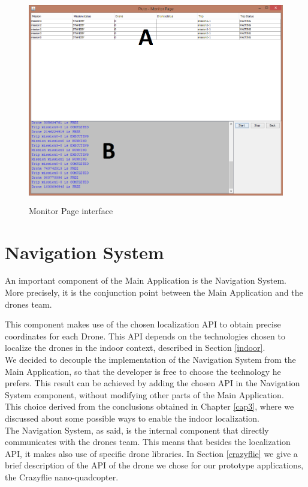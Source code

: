 \begin{figure}[h!]
  \centering
  \includegraphics[width=\linewidth,height=9cm]
  {pictures/MonitorPage.png}
  \caption{Monitor Page interface}
  \label{fig:MonitorPage}
\end{figure}

\section{Navigation System}\label{navigationSystem}

An important component of the Main Application is the Navigation System.
More precisely, it is the conjunction point between the Main Application and the drones team. 

This component makes use of the chosen localization API to obtain precise coordinates for each Drone.
This API depends on the technologies chosen to localize the drones in the indoor context, described in Section \ref{indoor}.
\\ 

We decided to decouple the implementation of the Navigation System from the Main Application, so that the developer is free to choose the technology he prefers.
This result can be achieved by adding the chosen API in the Navigation System component, without modifying other parts of the Main Application.
\\
This choice derived from the conclusions obtained in Chapter \ref{cap3}, where we discussed about some possible ways to enable the indoor localization.
\\
The Navigation System, as said, is the internal component that directly communicates with the drones team. 
This means that besides the localization API, it makes also use of specific drone libraries.
In Section \ref{crazyflie} we give a brief description of the API of the drone we chose for our prototype applications, the Crazyflie nano-quadcopter.
\\

